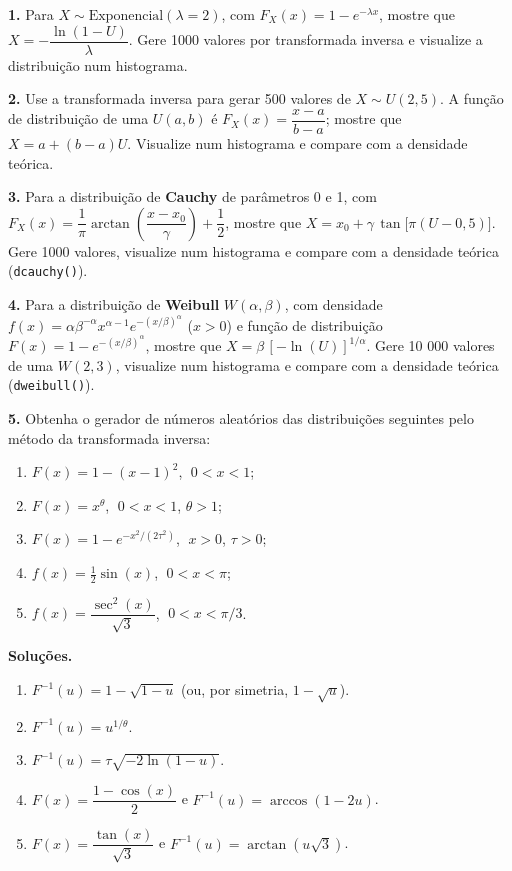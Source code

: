 \documentclass[
  portuguese,
  11pt,
  openany]{book}
\providecommand{\tightlist}{%
  \setlength{\itemsep}{0pt}\setlength{\parskip}{0pt}}
\begin{document}
\textbf{1.} Para \(X \sim \text{Exponencial}(\lambda = 2)\), com \(F_X(x) = 1 - e^{-\lambda x}\),
mostre que \(X = -\dfrac{\ln(1 - U)}{\lambda}\). Gere 1000 valores por transformada inversa
e visualize a distribuição num histograma.

\textbf{2.} Use a transformada inversa para gerar 500 valores de \(X \sim U(2, 5)\). A função de
distribuição de uma \(U(a, b)\) é \(F_X(x) = \dfrac{x - a}{b - a}\); mostre que
\(X = a + (b - a)U\). Visualize num histograma e compare com a densidade teórica.

\textbf{3.} Para a distribuição de \textbf{Cauchy} de parâmetros 0 e 1, com
\(F_X(x) = \dfrac{1}{\pi}\arctan\!\left(\dfrac{x - x_0}{\gamma}\right) + \dfrac{1}{2}\),
mostre que \(X = x_0 + \gamma\,\tan\!\big[\pi(U - 0{,}5)\big]\). Gere 1000 valores,
visualize num histograma e compare com a densidade teórica (\texttt{dcauchy()}).

\textbf{4.} Para a distribuição de \textbf{Weibull} \(W(\alpha, \beta)\), com densidade
\(f(x) = \alpha \beta^{-\alpha} x^{\alpha - 1} e^{-(x/\beta)^\alpha}\) (\(x > 0\)) e função
de distribuição \(F(x) = 1 - e^{-(x/\beta)^\alpha}\), mostre que
\(X = \beta\,[-\ln(U)]^{1/\alpha}\). Gere 10 000 valores de uma \(W(2, 3)\), visualize num
histograma e compare com a densidade teórica (\texttt{dweibull()}).

\textbf{5.} Obtenha o gerador de números aleatórios das distribuições seguintes pelo método
da transformada inversa:

\begin{enumerate}
\def\labelenumi{(\alph{enumi})}
\tightlist
\item
  \(F(x) = 1 - (x - 1)^2\), \(\;0 < x < 1\);
\item
  \(F(x) = x^\theta\), \(\;0 < x < 1\), \(\theta > 1\);
\item
  \(F(x) = 1 - e^{-x^2 / (2\tau^2)}\), \(\;x > 0\), \(\tau > 0\);
\item
  \(f(x) = \tfrac{1}{2}\sin(x)\), \(\;0 < x < \pi\);
\item
  \(f(x) = \dfrac{\sec^2(x)}{\sqrt{3}}\), \(\;0 < x < \pi/3\).
\end{enumerate}

\textbf{Soluções.}

\begin{enumerate}
\def\labelenumi{(\alph{enumi})}
\tightlist
\item
  \(F^{-1}(u) = 1 - \sqrt{1 - u}\) (ou, por simetria, \(1 - \sqrt{u}\)).
\item
  \(F^{-1}(u) = u^{1/\theta}\).
\item
  \(F^{-1}(u) = \tau\sqrt{-2\ln(1 - u)}\).
\item
  \(F(x) = \dfrac{1 - \cos(x)}{2}\) e \(F^{-1}(u) = \arccos(1 - 2u)\).
\item
  \(F(x) = \dfrac{\tan(x)}{\sqrt{3}}\) e \(F^{-1}(u) = \arctan(u\sqrt{3})\).
\end{enumerate}
\end{document}
